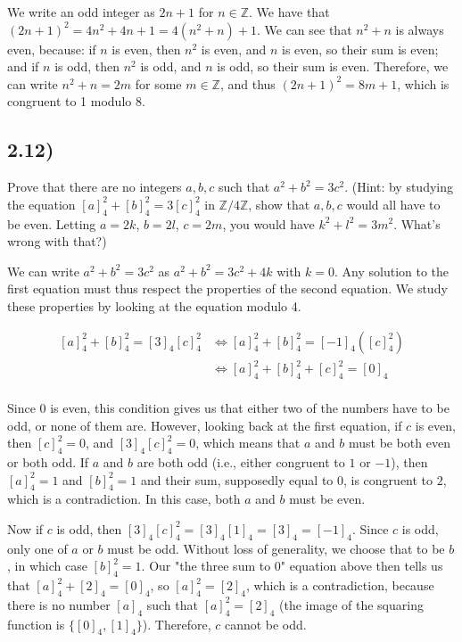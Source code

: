 We write an odd integer as $2n + 1$ for $n \in \mathbb{Z}$. We have that $(2n + 1)^2 = 4n^2 + 4n + 1 = 4(n^2 + n) + 1$. We can see that $n^2 + n$ is always even, because: if $n$ is even, then $n^2$ is even, and $n$ is even, so their sum is even; and if $n$ is odd, then $n^2$ is odd, and $n$ is odd, so their sum is even. Therefore, we can write $n^2 + n = 2m$ for some $m \in \mathbb{Z}$, and thus $(2n + 1)^2 = 8m + 1$, which is congruent to 1 modulo 8.


\subsection*{2.12)}

Prove that there are no integers $a, b, c$ such that $a^2 + b^2 = 3c^2$. (Hint: by studying the equation $[a]^2_4 + [b]^2_4 = 3[c]^2_4$ in $\mathbb{Z}/4\mathbb{Z}$, show that $a, b, c$ would all have to be even. Letting $a = 2k$, $b = 2l$, $c = 2m$, you would have $k^2 + l^2 = 3m^2$. What's wrong with that?)

We can write $a^2 + b^2 = 3c^2$ as $a^2 + b^2 = 3c^2 + 4k$ with $k = 0$. Any solution to the first equation must thus respect the properties of the second equation. We study these properties by looking at the equation modulo 4.

$$
\begin{aligned}
[a]^2_4 + [b]^2_4 = [3]_4 [c]^2_4
&\Leftrightarrow [a]^2_4 + [b]^2_4 = [-1]_4 ([c]^2_4) \\
&\Leftrightarrow [a]^2_4 + [b]^2_4 + [c]^2_4 = [0]_4 \\
\end{aligned}
$$

Since 0 is even, this condition gives us that either two of the numbers have to be odd, or none of them are. However, looking back at the first equation, if $c$ is even, then $[c]^2_4 = 0$, and $[3]_4 [c]^2_4 = 0$, which means that $a$ and $b$ must be both even or both odd. If $a$ and $b$ are both odd (i.e., either congruent to $1$ or $-1$), then $[a]^2_4 = 1$ and $[b]^2_4 = 1$ and their sum, supposedly equal to $0$, is congruent to $2$, which is a contradiction. In this case, both $a$ and $b$ must be even.

Now if $c$ is odd, then $[3]_4 [c]^2_4 = [3]_4 [1]_4 = [3]_4 = [-1]_4$. Since $c$ is odd, only one of $a$ or $b$ must be odd. Without loss of generality, we choose that to be $b$, in which case $[b]^2_4 = 1$. Our "the three sum to 0" equation above then tells us that $[a]^2_4 + [2]_4 = [0]_4$, so $[a]^2_4 = [2]_4$, which is a contradiction, because there is no number $[a]_4$ such that $[a]^2_4 = [2]_4$ (the image of the squaring function is $\{ [0]_4, [1]_4 \}$). Therefore, $c$ cannot be odd.

